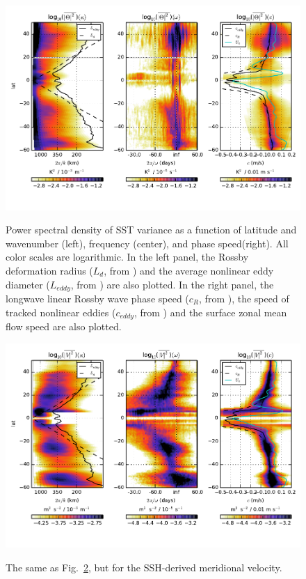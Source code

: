 \documentclass[10pt]{article}
\begin{document}
\begin{figure}[t]
  \noindent\includegraphics{../figures/50degwide/integrated_spectra_T.pdf}\\
  \caption{Power spectral density of SST variance as a function of latitude and wavenumber (left), frequency (center), and phase speed(right). All color scales are logarithmic. In the left panel, the Rossby deformation radius ($L_d$, from \citealt{TullochEtAl2011}) and the average nonlinear eddy diameter ($L_{eddy}$, from \citealt{CheltonEtAl2011}) are also plotted. In the right panel, the longwave linear Rossby wave phase speed ($c_R$, from \citealt{TullochEtAl2011}), the speed of tracked nonlinear eddies ($c_{eddy}$, from \citealt{CheltonEtAl2011}) and the surface zonal mean flow speed are also plotted.}
  \label{fig:integrated_spectra_T}
\end{figure}

\begin{figure}[t]
  \noindent\includegraphics{../figures/50degwide/integrated_spectra_V.pdf}\\
  \caption{The same as Fig.~\ref{fig:integrated_spectra_V}, but for the SSH-derived meridional velocity.}
  \label{fig:integrated_spectra_V}
\end{figure}
\end{document}
